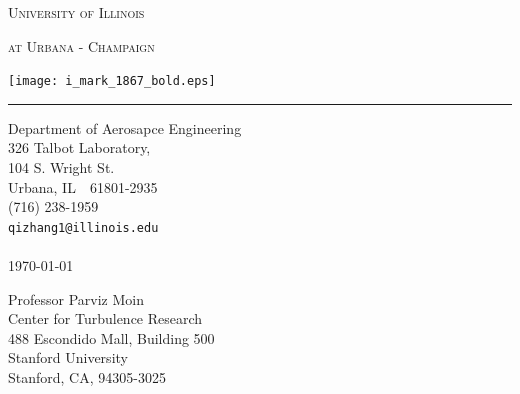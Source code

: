 \documentclass[11pt]{article}
\begin{document}
\thispagestyle{empty}
\vspace*{-1.6truein}
\hspace*{0.0 truein}
\centerline{\LARGE\textsc{University of Illinois}}
\hspace*{0.0truein}
\centerline{\Large\textsc{at Urbana - Champaign}}
%
%


\hspace*{1.16truein}
\begin{minipage}[t]{0.30\textwidth}
\vspace*{-0.25truein}
\hspace*{0.0 truein}
\hfill\texttt{[image: i\_mark\_1867\_bold.eps]}
\par\vspace*{0pt}
\end{minipage} 
\hspace*{-2.0 truein}

\rule[0.8em]{\textwidth}{1.0pt} 


\begin{minipage}[t]{1.0\textwidth}
\small
\begin{flushright}
Department of Aerosapce Engineering \\
326 Talbot Laboratory, \\
104 S. Wright St. \\
Urbana, IL\ \ 61801-2935 \\
(716) 238-1959 \\
\texttt{qizhang1@illinois.edu}\\
\text{ }\\
\today 
\end{flushright}
\vspace{0pt}
\end{minipage} 

%
%
\begin{minipage}[b]{0.7\textwidth}
\noindent
\small
\begin{tabbing}
Professor Parviz Moin\\
Center for Turbulence Research\\
488 Escondido Mall, Building 500\\
Stanford University\\
Stanford, CA, 94305-3025
\end{tabbing}
\vspace{0pt}
\end{minipage} \hfill
%
%



\end{document}
